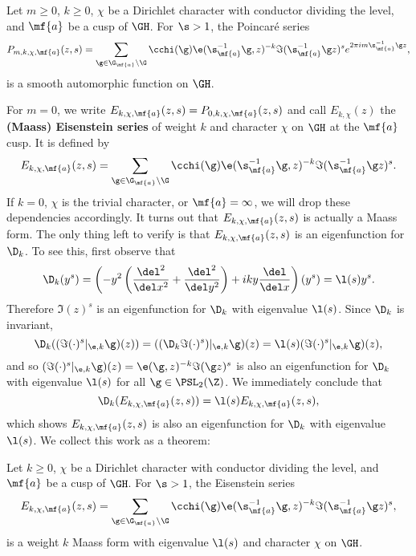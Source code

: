     \begin{theorem}
      Let $m \ge 0$, $k \ge 0$, $\chi$ be a Dirichlet character with conductor dividing the level, and $\mf{a}$ be a cusp of $\GH$. For $\s > 1$, the Poincar\'e series
      \[
        P_{m,k,\chi,\mf{a}}(z,s) = \sum_{\g \in \G_{\mf{a}}\backslash\G}\cchi(\g)\e(\s_{\mf{a}}^{-1}\g,z)^{-k}\Im(\s_{\mf{a}}^{-1}\g z)^{s}e^{2\pi im\s_{\mf{a}}^{-1}\g z},
      \]
      is a smooth automorphic function on $\GH$.
    \end{theorem}
    
    For $m = 0$, we write $E_{k,\chi,\mf{a}}(z,s) = P_{0,k,\chi,\mf{a}}(z,s)$ and call $E_{k,\chi}(z)$ the \textbf{(Maass) Eisenstein series} of weight $k$ and character $\chi$ on $\GH$ at the $\mf{a}$ cusp. It is defined by
    \[
      E_{k,\chi,\mf{a}}(z,s) = \sum_{\g \in \G_{\mf{a}}\backslash\G}\cchi(\g)\e(\s_{\mf{a}}^{-1}\g,z)^{-k}\Im(\s_{\mf{a}}^{-1}\g z)^{s}.
    \]
    If $k = 0$, $\chi$ is the trivial character, or $\mf{a} = \infty$, we will drop these dependencies accordingly. It turns out that $E_{k,\chi,\mf{a}}(z,s)$ is actually a Maass form. The only thing left to verify is that $E_{k,\chi,\mf{a}}(z,s)$ is an eigenfunction for $\D_{k}$. To see this, first observe that
    \[
      \D_{k}(y^{s}) = \left(-y^{2}\left(\frac{\del^{2}}{\del x^{2}}+\frac{\del^{2}}{\del y^{2}}\right)+iky\frac{\del}{\del x}\right)(y^{s}) = \l(s)y^{s}.
    \]
    Therefore $\Im(z)^{s}$ is an eigenfunction for $\D_{k}$ with eigenvalue $\l(s)$. Since $\D_{k}$ is invariant,
    \[
      \D_{k}((\Im(\cdot)^{s}|_{\e,k}\g)(z)) = ((\D_{k}\Im(\cdot)^{s})|_{\e,k}\g)(z) = \l(s)(\Im(\cdot)^{s}|_{\e,k}\g)(z),
    \]
    and so $(\Im(\cdot)^{s}|_{\e,k}\g)(z) = \e(\g,z)^{-k}\Im(\g z)^{s}$ is also an eigenfunction for $\D_{k}$ with eigenvalue $\l(s)$ for all $\g \in \PSL_{2}(\Z)$. We immediately conclude that
    \[
      \D_{k}(E_{k,\chi,\mf{a}}(z,s)) = \l(s)E_{k,\chi,\mf{a}}(z,s),
    \]
    which shows $E_{k,\chi,\mf{a}}(z,s)$ is also an eigenfunction for $\D_{k}$ with eigenvalue $\l(s)$. We collect this work as a theorem:

    \begin{theorem}
      Let $k \ge 0$, $\chi$ be a Dirichlet character with conductor dividing the level, and $\mf{a}$ be a cusp of $\GH$. For $\s > 1$, the Eisenstein series
      \[
        E_{k,\chi,\mf{a}}(z,s) = \sum_{\g \in \G_{\mf{a}}\backslash\G}\cchi(\g)\e(\s_{\mf{a}}^{-1}\g,z)^{-k}\Im(\s_{\mf{a}}^{-1}\g z)^{s},
      \]
      is a weight $k$ Maass form with eigenvalue $\l(s)$ and character $\chi$ on $\GH$.
    \end{theorem}
